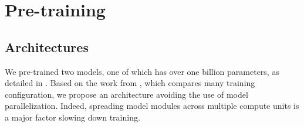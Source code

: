 
\section{Pre-training}







\subsection{Architectures} 

We pre-trained two models, one of which has over one billion parameters, as detailed in . Based on the work from \textcite{shoeybi_19}, which compares many training configuration, we propose an architecture avoiding the use of model parallelization. Indeed, spreading model modules across multiple compute units is a major factor slowing down training.

